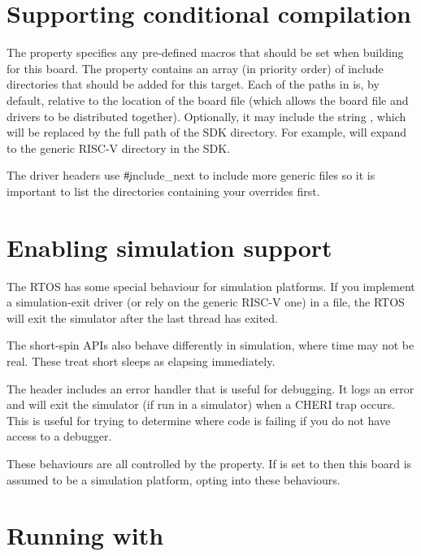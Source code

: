 \section{Supporting conditional compilation}

The  property specifies any pre-defined macros that should be set when building for this board.
The  property contains an array (in priority order) of include directories that should be added for this target.
Each of the paths in  is, by default, relative to the location of the board file (which allows the board file and drivers to be distributed together).
Optionally, it may include the string , which will be replaced by the full path of the SDK directory.
For example,  will expand to the generic RISC-V directory in the SDK.

The driver headers use \c{#include_next} to include more generic files so it is important to list the directories containing your overrides first.

\section{Enabling simulation support}

The RTOS has some special behaviour for simulation platforms.
If you implement a simulation-exit driver (or rely on the generic RISC-V one) in a  file, the RTOS will exit the simulator after the last thread has exited.

The short-spin APIs also behave differently in simulation, where time may not be real.
These treat short sleeps as elapsing immediately.

The  header includes an error handler that is useful for debugging.
It logs an error and will exit the simulator (if run in a simulator) when a CHERI trap occurs.
This is useful for trying to determine where code is failing if you do not have access to a debugger.

These behaviours are all controlled by the  property.
If  is set to  then this board is assumed to be a simulation platform, opting into these behaviours.

\section{Running with }

